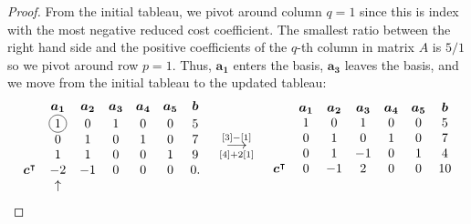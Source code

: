 \documentclass[12pt]{article}
\newcommand*\circled[1]{\tikz[baseline=(char.base)]{
            \node[shape=circle,draw,inner sep=2pt] (char) {#1};}}
\theoremstyle{definition}
\newcommand{\vect}[1]{\boldsymbol{#1}}
\newcommand{\grstep}[2][\relax]{%
   \ensuremath{\mathrel{
       {\mathop{\longrightarrow}\limits^{#2\mathstrut}_{
                                     \begin{subarray}{l} #1 \end{subarray}}}}}}
\begin{document}
\begin{proof}
  From the initial tableau, we pivot around column
  $q=1$ since this is index with the most negative reduced cost coefficient.
  The smallest ratio between the right hand side and the positive coefficients
  of the $q$-th column in matrix $A$ is $5/1$ so we pivot around row $p=1$. Thus, $\vect{a_1}$
  enters the basis, $\vect{a_3}$ leaves the basis, and we move from the initial tableau to the updated tableau:
  \begin{align*}
    \begin{matrix}
      & \vect{a_1} & \vect{a_2} & \vect{a_3} & \vect{a_4} & \vect{a_5} & \vect{b} \\
      & \circled{1} & 0 & 1 & 0 & 0 & 5 \\
      & 0 & 1 & 0 & 1 & 0 & 7 \\
      & 1 & 1 & 0 & 0 & 1 & 9 \\
      \vect{c}^\intercal & -2 & -1 & 0 & 0 & 0 & 0. \\
      & \uparrow & & & & & \\
    \end{matrix}
    \quad
    \begin{array}{c}
    \grstep[{[4] + 2[1]}]{[3] - [1]} \\
    \end{array}
    \quad
    \begin{matrix}
      & \vect{a_1} & \vect{a_2} & \vect{a_3} & \vect{a_4} & \vect{a_5} & \vect{b} \\
                       & 1 & 0 & 1 & 0 & 0 & 5 \\
                       & 0 & 1 & 0 & 1 & 0 & 7 \\
                       & 0 & 1 & -1 & 0 & 1 & 4 \\
      \vect{c}^\intercal & 0 & -1 & 2 & 0 & 0 & 10 \\
      & & & & & & \\
    \end{matrix}
  \end{align*}


\end{proof}
\end{document}
